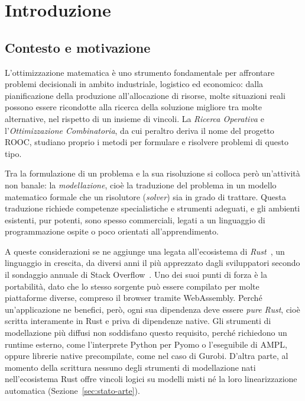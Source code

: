 
\chapter{Introduzione}
\label{cap:introduzione}

\section{Contesto e motivazione}
\label{sec:contesto}

L'ottimizzazione matematica è uno strumento fondamentale per affrontare problemi
decisionali in ambito industriale, logistico ed economico: dalla pianificazione
della produzione all'allocazione di risorse, molte situazioni reali possono
essere ricondotte alla ricerca della soluzione migliore tra molte alternative,
nel rispetto di un insieme di vincoli. La \emph{Ricerca Operativa} e
l'\emph{Ottimizzazione Combinatoria}, da cui peraltro deriva il nome del progetto
ROOC, studiano proprio i metodi per formulare e risolvere problemi di questo tipo.

Tra la formulazione di un problema e la sua risoluzione si colloca però
un'attività non banale: la \emph{modellazione}, cioè la traduzione del problema
in un modello matematico formale che un risolutore (\emph{solver}) sia in grado
di trattare. Questa traduzione richiede competenze specialistiche e strumenti
adeguati, e gli ambienti esistenti, pur potenti, sono spesso commerciali, legati
a un linguaggio di programmazione ospite o poco orientati all'apprendimento.

A queste considerazioni se ne aggiunge una legata all'ecosistema di
\emph{Rust}~\cite{rust2019}, un linguaggio in crescita, da diversi anni il più
apprezzato dagli sviluppatori secondo il sondaggio annuale di Stack
Overflow~\cite{sosurvey2025}. Uno dei suoi punti di forza è la portabilità, dato che
lo stesso sorgente può essere compilato per molte piattaforme diverse, compreso il
browser tramite WebAssembly. Perché un'applicazione ne benefici, però, ogni sua
dipendenza deve essere \emph{pure Rust}, cioè scritta interamente in Rust e
priva di dipendenze native. Gli strumenti di modellazione più diffusi non
soddisfano questo requisito, perché richiedono un runtime esterno, come
l'interprete Python per Pyomo o l'eseguibile di AMPL, oppure librerie native
precompilate, come nel caso di Gurobi. D'altra parte, al momento della
scrittura nessuno degli strumenti di modellazione nati nell'ecosistema Rust
offre vincoli logici su modelli misti né la loro linearizzazione automatica
(Sezione~\ref{sec:stato-arte}).

